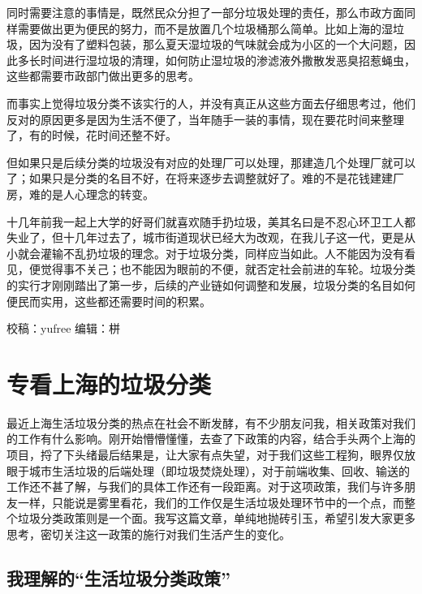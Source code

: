 \documentclass[
]{book}
\begin{document}
同时需要注意的事情是，既然民众分担了一部分垃圾处理的责任，那么市政方面同样需要做出更为便民的努力，而不是放置几个垃圾桶那么简单。比如上海的湿垃圾，因为没有了塑料包装，那么夏天湿垃圾的气味就会成为小区的一个大问题，因此多长时间进行湿垃圾的清理，如何防止湿垃圾的渗滤液外撒散发恶臭招惹蝇虫，这些都需要市政部门做出更多的思考。

而事实上觉得垃圾分类不该实行的人，并没有真正从这些方面去仔细思考过，他们反对的原因更多是因为生活不便了，当年随手一装的事情，现在要花时间来整理了，有的时候，花时间还整不好。

但如果只是后续分类的垃圾没有对应的处理厂可以处理，那建造几个处理厂就可以了；如果只是分类的名目不好，在将来逐步去调整就好了。难的不是花钱建建厂房，难的是人心理念的转变。

十几年前我一起上大学的好哥们就喜欢随手扔垃圾，美其名曰是不忍心环卫工人都失业了，但十几年过去了，城市街道现状已经大为改观，在我儿子这一代，更是从小就会灌输不乱扔垃圾的理念。对于垃圾分类，同样应当如此。人不能因为没有看见，便觉得事不关己；也不能因为眼前的不便，就否定社会前进的车轮。垃圾分类的实行才刚刚踏出了第一步，后续的产业链如何调整和发展，垃圾分类的名目如何便民而实用，这些都还需要时间的积累。

校稿：yufree
编辑：栟

\hypertarget{ux4e13ux770bux4e0aux6d77ux7684ux5783ux573eux5206ux7c7b}{%
\section{专看上海的垃圾分类}\label{ux4e13ux770bux4e0aux6d77ux7684ux5783ux573eux5206ux7c7b}}

最近上海生活垃圾分类的热点在社会不断发酵，有不少朋友问我，相关政策对我们的工作有什么影响。刚开始懵懵懂懂，去查了下政策的内容，结合手头两个上海的项目，捋了下头绪最后结果是，让大家有点失望，对于我们这些工程狗，眼界仅放眼于城市生活垃圾的后端处理（即垃圾焚烧处理），对于前端收集、回收、输送的工作还不甚了解，与我们的具体工作还有一段距离。对于这项政策，我们与许多朋友一样，只能说是雾里看花，我们的工作仅是生活垃圾处理环节中的一个点，而整个垃圾分类政策则是一个面。我写这篇文章，单纯地抛砖引玉，希望引发大家更多思考，密切关注这一政策的施行对我们生活产生的变化。

\hypertarget{ux6211ux7406ux89e3ux7684ux751fux6d3bux5783ux573eux5206ux7c7bux653fux7b56}{%
\subsection{我理解的``生活垃圾分类政策''}\label{ux6211ux7406ux89e3ux7684ux751fux6d3bux5783ux573eux5206ux7c7bux653fux7b56}}
\end{document}
